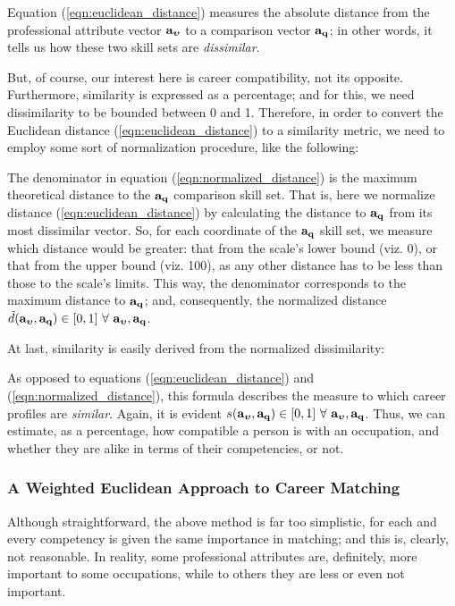 \documentclass{article}
\begin{document}
Equation (\ref{eqn:euclidean_distance}) measures the absolute distance from the professional attribute vector $\vb{a_{\boldsymbol{\upsilon}}}$ to a comparison vector $\vb{a_{q}}$; in other words, it tells us how these two skill sets are \textit{dissimilar}. 

But, of course, our interest here is career compatibility, not its opposite. Furthermore, similarity is expressed as a percentage; and for this, we need dissimilarity to be bounded between 0 and 1. Therefore, in order to convert the Euclidean distance (\ref{eqn:euclidean_distance}) to a similarity metric, we need to employ some sort of normalization procedure, like the following:
\EqnNormalizedDistance

The denominator in equation (\ref{eqn:normalized_distance}) is the maximum theoretical distance to the $\vb{a_q}$ comparison skill set. That is, here we normalize distance (\ref{eqn:euclidean_distance}) by calculating the distance to $\vb{a_q}$ from its most dissimilar vector. So, for each coordinate of the $\vb{a_{q}}$ skill set, we measure which distance would be greater: that from the scale's lower bound (viz. 0), or that from the upper bound (viz. 100), as any other distance has to be less than those to the scale's limits. This way, the denominator corresponds to the maximum distance to $\vb{a_{q}}$; and, consequently, the normalized distance $\tilde{d}(\vb{a_{\boldsymbol{\upsilon}}}, \vb{a_{q}}) \in [0,1] \ \forall \ \vb{a_{\boldsymbol{\upsilon}}}, \vb{a_{q}}$.

At last, similarity is easily derived from the normalized dissimilarity:
\EqnSimilarity

As opposed to equations (\ref{eqn:euclidean_distance}) and (\ref{eqn:normalized_distance}), this formula describes the measure to which career profiles are \textit{similar}. Again, it is evident $s(\vb{a_{\boldsymbol{\upsilon}}}, \vb{a_{q}}) \in [0,1] \ \forall \ \vb{a_{\boldsymbol{\upsilon}}}, \vb{a_{q}}$. Thus, we can estimate, as a percentage, how compatible a person is with an occupation, and whether they are alike in terms of their competencies, or not.

\subsubsection{A Weighted Euclidean Approach to Career Matching}
Although straightforward, the above method is far too simplistic, for each and every competency is given the same importance in matching; and this is, clearly, not reasonable. In reality, some professional attributes are, definitely, more important to some occupations, while to others they are less or even not important.
\end{document}
